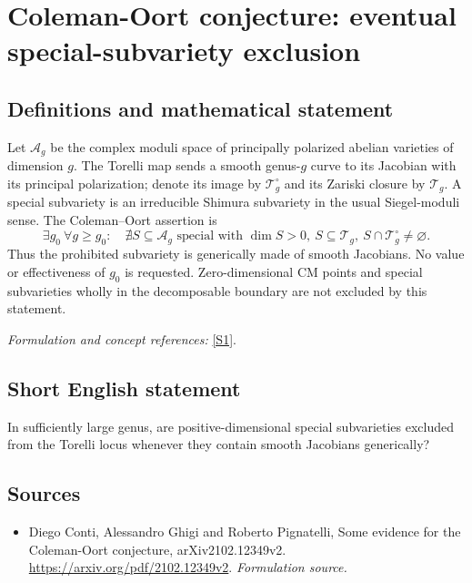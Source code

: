 \documentclass[11pt]{article}
\begin{document}
\section*{\texorpdfstring{Coleman-Oort conjecture: eventual special-subvariety exclusion}{Coleman-Oort conjecture: eventual special-subvariety exclusion}}\label{403}
\subsection{Definitions and mathematical statement}
Let $\mathcal A_g$ be the complex moduli space of principally polarized abelian varieties of dimension $g$. The Torelli map sends a smooth genus-$g$ curve to its Jacobian with its principal polarization; denote its image by $\mathcal T_g^\circ$ and its Zariski closure by $\mathcal T_g$. A special subvariety is an irreducible Shimura subvariety in the usual Siegel-moduli sense. The Coleman--Oort assertion is
\[
 \exists g_0\ \forall g\ge g_0:\quad
 \nexists S\subseteq\mathcal A_g\text{ special with }
 \dim S>0,\ S\subseteq\mathcal T_g,\ S\cap\mathcal T_g^\circ\ne\varnothing.
\]
Thus the prohibited subvariety is generically made of smooth Jacobians. No value or effectiveness of $g_0$ is requested. Zero-dimensional CM points and special subvarieties wholly in the decomposable boundary are not excluded by this statement.
\par\smallskip\textit{Formulation and concept references:} \href{https://arxiv.org/pdf/2102.12349v2}{[S1]}.

\subsection{Short English statement}
In sufficiently large genus, are positive-dimensional special subvarieties excluded from the Torelli locus whenever they contain smooth Jacobians generically?
\subsection{Sources}
\begin{itemize}
\item[S1]Diego Conti, Alessandro Ghigi and Roberto Pignatelli, Some evidence for the Coleman-Oort conjecture, arXiv2102.12349v2.
\url{https://arxiv.org/pdf/2102.12349v2}.
\textit{Formulation source.}
\end{itemize}
\end{document}
